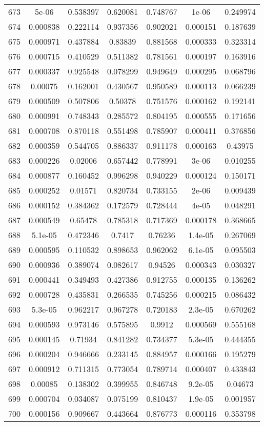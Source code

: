\begin{table}
\begin{tabular}{c|c|c|c|c|c|c}
673 & 5e-06 & 0.538397 & 0.620081 & 0.748767 & 1e-06 & 0.249974\\
674 & 0.000838 & 0.222114 & 0.937356 & 0.902021 & 0.000151 & 0.187639\\
675 & 0.000971 & 0.437884 & 0.83839 & 0.881568 & 0.000333 & 0.323314\\
676 & 0.000715 & 0.410529 & 0.511382 & 0.781561 & 0.000197 & 0.163916\\
677 & 0.000337 & 0.925548 & 0.078299 & 0.949649 & 0.000295 & 0.068796\\
678 & 0.00075 & 0.162001 & 0.430567 & 0.950589 & 0.000113 & 0.066239\\
679 & 0.000509 & 0.507806 & 0.50378 & 0.751576 & 0.000162 & 0.192141\\
680 & 0.000991 & 0.748343 & 0.285572 & 0.804195 & 0.000555 & 0.171656\\
681 & 0.000708 & 0.870118 & 0.551498 & 0.785907 & 0.000411 & 0.376856\\
682 & 0.000359 & 0.544705 & 0.886337 & 0.911178 & 0.000163 & 0.43975\\
683 & 0.000226 & 0.02006 & 0.657442 & 0.778991 & 3e-06 & 0.010255\\
684 & 0.000877 & 0.160452 & 0.996298 & 0.940229 & 0.000124 & 0.150171\\
685 & 0.000252 & 0.01571 & 0.820734 & 0.733155 & 2e-06 & 0.009439\\
686 & 0.000152 & 0.384362 & 0.172579 & 0.728444 & 4e-05 & 0.048291\\
687 & 0.000549 & 0.65478 & 0.785318 & 0.717369 & 0.000178 & 0.368665\\
688 & 5.1e-05 & 0.472346 & 0.7417 & 0.76236 & 1.4e-05 & 0.267069\\
689 & 0.000595 & 0.110532 & 0.898653 & 0.962062 & 6.1e-05 & 0.095503\\
690 & 0.000936 & 0.389074 & 0.082617 & 0.94526 & 0.000343 & 0.030327\\
691 & 0.000441 & 0.349493 & 0.427386 & 0.912755 & 0.000135 & 0.136262\\
692 & 0.000728 & 0.435831 & 0.266535 & 0.745256 & 0.000215 & 0.086432\\
693 & 5.3e-05 & 0.962217 & 0.967278 & 0.720183 & 2.3e-05 & 0.670262\\
694 & 0.000593 & 0.973146 & 0.575895 & 0.9912 & 0.000569 & 0.555168\\
695 & 0.000145 & 0.71934 & 0.841282 & 0.734377 & 5.3e-05 & 0.444355\\
696 & 0.000204 & 0.946666 & 0.233145 & 0.884957 & 0.000166 & 0.195279\\
697 & 0.000912 & 0.711315 & 0.773054 & 0.789714 & 0.000407 & 0.433843\\
698 & 0.00085 & 0.138302 & 0.399955 & 0.846748 & 9.2e-05 & 0.04673\\
699 & 0.000704 & 0.034087 & 0.075199 & 0.810437 & 1.9e-05 & 0.001957\\
700 & 0.000156 & 0.909667 & 0.443664 & 0.876773 & 0.000116 & 0.353798\\
\end{tabular}
\end{table}

